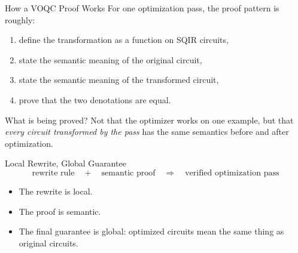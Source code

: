 \documentclass[aspectratio=169]{beamer}
\begin{document}
\begin{frame}{How a VOQC Proof Works}
\justifying
For one optimization pass, the proof pattern is roughly:

\vspace{0.6em}
\begin{enumerate}
    \item define the transformation as a function on SQIR circuits,
    \item state the semantic meaning of the original circuit,
    \item state the semantic meaning of the transformed circuit,
    \item prove that the two denotations are equal.
\end{enumerate}

\vspace{0.8em}
\begin{block}{What is being proved?}
Not that the optimizer works on one example, but that \emph{every circuit transformed by the pass}
has the same semantics before and after optimization.
\end{block}
\end{frame}


\begin{frame}{Local Rewrite, Global Guarantee}
\centering
\Large
\[
\text{rewrite rule} \quad + \quad \text{semantic proof}
\quad \Longrightarrow \quad
\text{verified optimization pass}
\]

\vspace{1em}
\normalsize
\begin{itemize}
    \item The rewrite is local.
    \item The proof is semantic.
    \item The final guarantee is global: optimized circuits mean the same thing as original circuits.
\end{itemize}
\end{frame}

\end{document}
